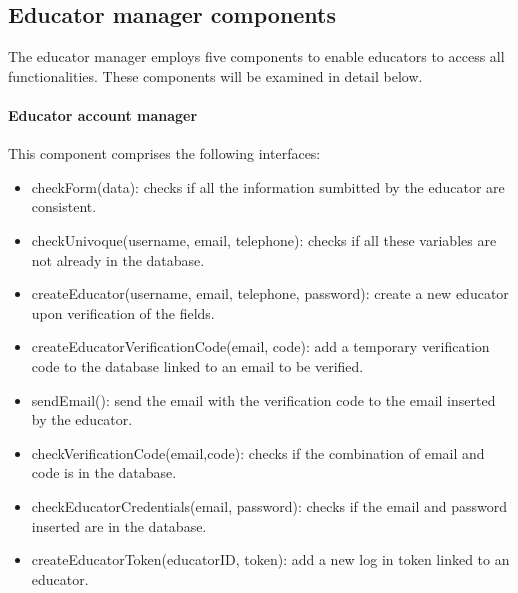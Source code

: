 \documentclass[12pt, a4paper]{report}
\begin{document}
    \subsection{Educator manager components}
    The educator manager employs five components to enable educators to access all functionalities. 
    These components will be examined in detail below.
    
    \paragraph*{Educator account manager}
    This component comprises the following interfaces: 
    \begin{itemize}
        \item checkForm(data): checks if all the information sumbitted by the educator are consistent. 
        \item checkUnivoque(username, email, telephone): checks if all these variables are not already in the database. 
        \item createEducator(username, email, telephone, password): create a new educator upon verification of the fields. 
        \item createEducatorVerificationCode(email, code): add a temporary verification code to the database linked to an email to be verified. 
        \item sendEmail(): send the email with the verification code to the email inserted by the educator. 
        \item checkVerificationCode(email,code): checks if the combination of email and code is in the database. 
        \item checkEducatorCredentials(email, password): checks if the email and password inserted are in the database. 
        \item createEducatorToken(educatorID, token): add a new log in token linked to an educator. 
    \end{itemize}
\end{document}
